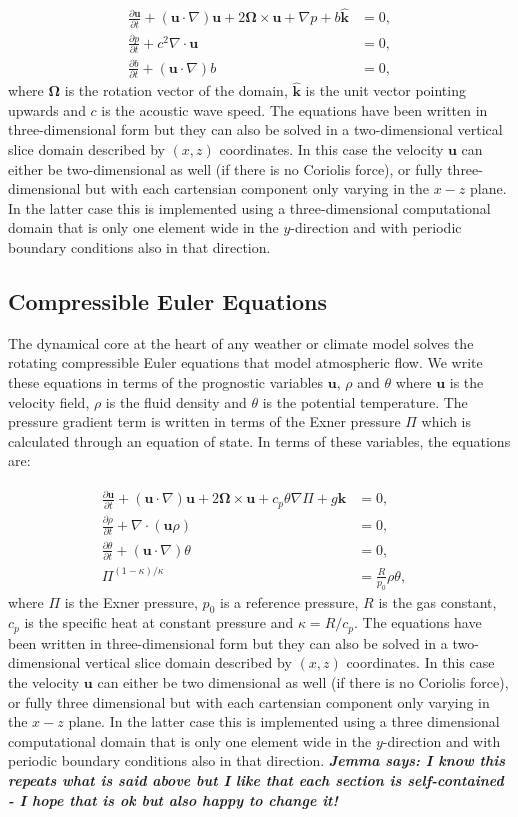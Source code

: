 \documentclass[journal abbreviation, manuscript]{copernicus}
\def\MM#1{\boldsymbol{#1}}
\newcommand{\pp}[2]{\frac{\partial #1}{\partial #2}}
\newcommand{\JScomment}[1]{\textit{\textbf{Jemma says: #1}}}
\begin{document}
\begin{align}
  \pp{\MM{u}}{t} + 
  (\MM{u}\cdot\nabla)\MM{u} +
  2\MM{\Omega}\times \MM{u} + \nabla p + b\hat{\MM{k}} & = 0, \\
  \pp{p}{t} + c^2\nabla\cdot\MM{u} & = 0, \\
  \pp{b}{t} + (\MM{u}\cdot\nabla) b & = 0,
\end{align}
where $\MM{\Omega}$ is the rotation vector of the domain,
$\hat{\MM{k}}$ is the unit vector pointing upwards and $c$ is the
acoustic wave speed. The equations have been written in
three-dimensional form but they can also be solved in a
two-dimensional vertical slice domain described by $(x, z)$
coordinates. In this case the velocity $\MM{u}$ can either be
two-dimensional as well (if there is no Coriolis force), or fully
three-dimensional but with each cartensian component only varying in
the $x-z$ plane. In the latter case this is implemented using a
three-dimensional computational domain that is only one element wide
in the $y$-direction and with periodic boundary conditions also in
that direction.

\subsection{Compressible Euler Equations}
The dynamical core at the heart of any weather or climate model solves
the rotating compressible Euler equations that model atmospheric
flow. We write these equations in terms of the prognostic variables
$\MM{u}$, $\rho$ and $\theta$ where $\MM{u}$ is the velocity field,
$\rho$ is the fluid density and $\theta$ is the potential
temperature. The pressure gradient term is written in terms of the
Exner pressure $\Pi$ which is calculated through an equation of
state. In terms of these variables, the equations are:

\begin{align}
  \pp{\MM{u}}{t} + 
  (\MM{u}\cdot\nabla)\MM{u} +
  2\MM{\Omega}\times \MM{u} + c_p\theta\nabla \Pi + g\hat{\MM{k}} & = 0, \\
  \pp{\rho}{t} + \nabla\cdot(\MM{u}\rho) & = 0, \\
  \pp{\theta}{t} + (\MM{u}\cdot\nabla)\theta & = 0, \\
  \Pi^{(1-\kappa)/\kappa} & = \frac{R}{p_0}\rho\theta, & 
\end{align}
where $\Pi$ is the Exner pressure, $p_0$ is a reference pressure, $R$
is the gas constant, $c_p$ is the specific heat at constant pressure
and $\kappa=R/c_p$. The equations have been written in
three-dimensional form but they can also be solved in a
two-dimensional vertical slice domain described by $(x, z)$
coordinates. In this case the velocity $\MM{u}$ can either be two
dimensional as well (if there is no Coriolis force), or fully three
dimensional but with each cartensian component only varying in the
$x-z$ plane. In the latter case this is implemented using a three
dimensional computational domain that is only one element wide in the
$y$-direction and with periodic boundary conditions also in that
direction. \JScomment{I know this repeats what is said above but I
  like that each section is self-contained - I hope that is ok but
  also happy to change it!}
\end{document}
